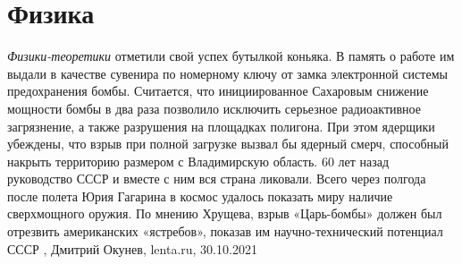  
 
 
 
 
\chapter{Физика}
\label{sec:slova.fizika}

\emph{Физики-теоретики} отметили свой успех бутылкой коньяка. В память о работе
им выдали в качестве сувенира по номерному ключу от замка электронной системы
предохранения бомбы. Считается, что инициированное Сахаровым снижение мощности
бомбы в два раза позволило исключить серьезное радиоактивное загрязнение, а
также разрушения на площадках полигона. При этом ядерщики убеждены, что взрыв
при полной загрузке вызвал бы ядерный смерч, способный накрыть территорию
размером с Владимирскую область.  60 лет назад руководство СССР и вместе с ним
вся страна ликовали. Всего через полгода после полета Юрия Гагарина в космос
удалось показать миру наличие сверхмощного оружия. По мнению Хрущева, взрыв
«Царь-бомбы» должен был отрезвить американских «ястребов», показав им
научно-технический потенциал СССР
, Дмитрий Окунев, lenta.ru, 30.10.2021
